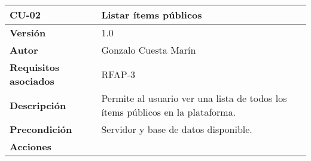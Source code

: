 \begin{longtable}[]{@{}ll@{}}
\toprule
\begin{minipage}[b]{0.20\columnwidth}\raggedright
\textbf{CU-02}\strut
\end{minipage} & \begin{minipage}[b]{0.74\columnwidth}\raggedright
\textbf{Listar ítems públicos}\strut
\end{minipage}\tabularnewline
\midrule
\endhead
\begin{minipage}[t]{0.20\columnwidth}\raggedright
\textbf{Versión}\strut
\end{minipage} & \begin{minipage}[t]{0.74\columnwidth}\raggedright
1.0\strut
\end{minipage}\tabularnewline
\begin{minipage}[t]{0.20\columnwidth}\raggedright
\textbf{Autor}\strut
\end{minipage} & \begin{minipage}[t]{0.74\columnwidth}\raggedright
Gonzalo Cuesta Marín\strut
\end{minipage}\tabularnewline
\begin{minipage}[t]{0.20\columnwidth}\raggedright
\textbf{Requisitos asociados}\strut
\end{minipage} & \begin{minipage}[t]{0.74\columnwidth}\raggedright
RFAP-3\strut
\end{minipage}\tabularnewline
\begin{minipage}[t]{0.20\columnwidth}\raggedright
\textbf{Descripción}\strut
\end{minipage} & \begin{minipage}[t]{0.74\columnwidth}\raggedright
Permite al usuario ver una lista de todos los ítems públicos en la
plataforma.\strut
\end{minipage}\tabularnewline
\begin{minipage}[t]{0.20\columnwidth}\raggedright
\textbf{Precondición}\strut
\end{minipage} & \begin{minipage}[t]{0.74\columnwidth}\raggedright
Servidor y base de datos disponible.\strut
\end{minipage}\tabularnewline
\begin{minipage}[t]{0.20\columnwidth}\raggedright
\textbf{Acciones}\strut
\end{minipage} & \begin{minipage}[t]{0.74\columnwidth}\raggedright
\begin{enumerate}

\end{enumerate}
\end{minipage}
\end{longtable}
